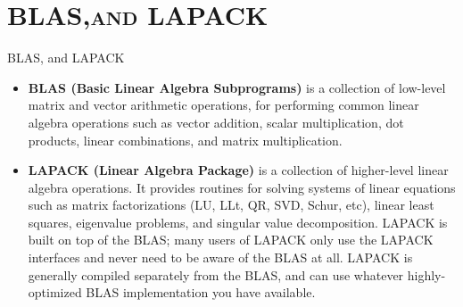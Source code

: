 \documentclass[xcolor=x11names,compress]{beamer}
\renewcommand{\(}{\begin{columns}}
\renewcommand{\)}{\end{columns}}
\newcommand{\<}[1]{\begin{column}{#1}}
\renewcommand{\>}{\end{column}}
\begin{document}
\section{\scshape BLAS,and LAPACK}%
\begin{frame}[fragile]{BLAS, and LAPACK}%
\begin{scriptsize}
\begin{itemize}
\item \textbf{BLAS (Basic Linear Algebra Subprograms)} is a collection of low-level matrix and vector arithmetic operations, for performing common linear algebra operations such as vector addition, scalar multiplication, dot products, linear combinations, and matrix multiplication.
		
\item \textbf{LAPACK (Linear Algebra Package)} is a collection of higher-level linear algebra operations. It provides routines for solving systems of linear equations such as matrix factorizations (LU, LLt, QR, SVD, Schur, etc), linear least squares, eigenvalue problems, and singular value decomposition. LAPACK is built on top of the BLAS; many users of LAPACK only use the LAPACK interfaces and never need to be aware of the BLAS at all. LAPACK is generally compiled separately from the BLAS, and can use whatever highly-optimized BLAS implementation you have available.
\end{itemize}
\end{scriptsize}
\end{frame}
\end{document}
